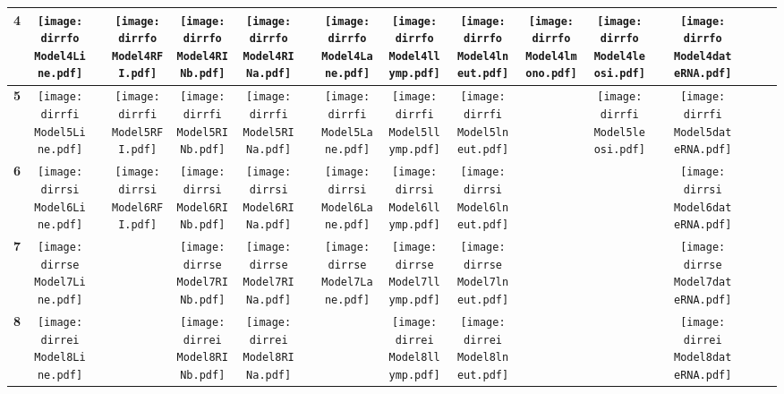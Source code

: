 \documentclass[landscape]{article}
\def \dirrfo {/run/user/1000/gvfs/smb-share:server=cyfiles.iastate.edu,share=09/22/ntyet/R/RA/Data/Reanalysis Data/resultcbc/Model4.Line.RFI.RINb.RINa.Lane.llymp.lneut.lmono.leosi.dateRNA/}
\def \dirrfi {/run/user/1000/gvfs/smb-share:server=cyfiles.iastate.edu,share=09/22/ntyet/R/RA/Data/Reanalysis Data/resultcbc/Model5.Line.RFI.RINb.RINa.Lane.llymp.lneut.leosi.dateRNA/}
\def \dirrsi{/run/user/1000/gvfs/smb-share:server=cyfiles.iastate.edu,share=09/22/ntyet/R/RA/Data/Reanalysis Data/resultcbc/Model6.Line.RFI.RINb.RINa.Lane.llymp.lneut.dateRNA/}
\def \dirrse{/run/user/1000/gvfs/smb-share:server=cyfiles.iastate.edu,share=09/22/ntyet/R/RA/Data/Reanalysis Data/resultcbc/Model7.Line.RINb.RINa.Lane.llymp.lneut.dateRNA/}
\def \dirrei{/run/user/1000/gvfs/smb-share:server=cyfiles.iastate.edu,share=09/22/ntyet/R/RA/Data/Reanalysis Data/resultcbc/Model8.Line.RINb.RINa.llymp.lneut.dateRNA/}
\begin{document}
\begin{table}
\begin{tabular}{ccccccccccccccccc}
      {\Huge \textbf{4}} 
      &\texttt{[image: \\dirrfo Model4Line.pdf]}
      &
      &\texttt{[image: \\dirrfo Model4RFI.pdf]}
      &\texttt{[image: \\dirrfo Model4RINb.pdf]}
      &\texttt{[image: \\dirrfo Model4RINa.pdf]}
      &
      &\texttt{[image: \\dirrfo Model4Lane.pdf]}
      &\texttt{[image: \\dirrfo Model4llymp.pdf]}
      &\texttt{[image: \\dirrfo Model4lneut.pdf]}
      &\texttt{[image: \\dirrfo Model4lmono.pdf]}
      &\texttt{[image: \\dirrfo Model4leosi.pdf]}
      &
      &\texttt{[image: \\dirrfo Model4dateRNA.pdf]}
      &
     \\
     \hline
     
     {\Huge \textbf{5}} 
      &\texttt{[image: \\dirrfi Model5Line.pdf]}
      &
      &\texttt{[image: \\dirrfi Model5RFI.pdf]}
      &\texttt{[image: \\dirrfi Model5RINb.pdf]}
      &\texttt{[image: \\dirrfi Model5RINa.pdf]}
      &
      &\texttt{[image: \\dirrfi Model5Lane.pdf]}
      &\texttt{[image: \\dirrfi Model5llymp.pdf]}
      &\texttt{[image: \\dirrfi Model5lneut.pdf]}
      &
      &\texttt{[image: \\dirrfi Model5leosi.pdf]}
      &
      &\texttt{[image: \\dirrfi Model5dateRNA.pdf]}
      &
     \\
     \hline
     {\Huge \textbf{6}} 
      &\texttt{[image: \\dirrsi Model6Line.pdf]}
      &
      &\texttt{[image: \\dirrsi Model6RFI.pdf]}
      &\texttt{[image: \\dirrsi Model6RINb.pdf]}
      &\texttt{[image: \\dirrsi Model6RINa.pdf]}
      &
      &\texttt{[image: \\dirrsi Model6Lane.pdf]}
      &\texttt{[image: \\dirrsi Model6llymp.pdf]}
      &\texttt{[image: \\dirrsi Model6lneut.pdf]}
      &
      &
      &
      &\texttt{[image: \\dirrsi Model6dateRNA.pdf]}
      &
     \\
     \hline
     {\Huge \textbf{7}} 
      &\texttt{[image: \\dirrse Model7Line.pdf]}
      &
      &
      &\texttt{[image: \\dirrse Model7RINb.pdf]}
      &\texttt{[image: \\dirrse Model7RINa.pdf]}
      &
      &\texttt{[image: \\dirrse Model7Lane.pdf]}
      &\texttt{[image: \\dirrse Model7llymp.pdf]}
      &\texttt{[image: \\dirrse Model7lneut.pdf]}
      &
      &
      &
      &\texttt{[image: \\dirrse Model7dateRNA.pdf]}
      &
     \\
     \hline
     {\Huge \textbf{8}} 
      &\texttt{[image: \\dirrei Model8Line.pdf]}
      &
      &
      &\texttt{[image: \\dirrei Model8RINb.pdf]}
      &\texttt{[image: \\dirrei Model8RINa.pdf]}
      &
      &
      &\texttt{[image: \\dirrei Model8llymp.pdf]}
      &\texttt{[image: \\dirrei Model8lneut.pdf]}
      &
      &
      &
      &\texttt{[image: \\dirrei Model8dateRNA.pdf]}
      &
     \\
     \hline
     
\end{tabular}
\end{table}
\end{document}
